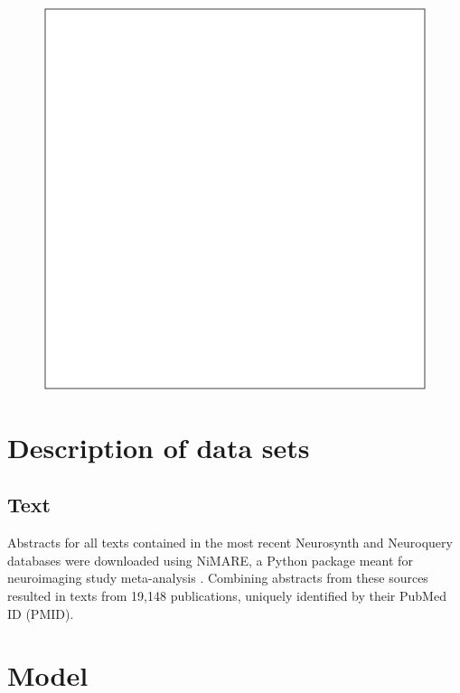 \begin{figure}[tp!]
  \centering	
    \includegraphics[width=\columnwidth]{figures/localized/null.pdf}  
  \caption{
  }
  \label{fig:papertag.}
\end{figure}

\section{Description of data sets}
\label{sec:papertag.data}

\subsection{Text}

Abstracts for all texts contained in the most recent Neurosynth and Neuroquery databases were downloaded using NiMARE, a Python package meant for neuroimaging study meta-analysis \cite{SaloEtAl2022, SaloEtAl2023}. Combining abstracts from these sources resulted in texts from 19,148 publications, uniquely identified by their PubMed ID (PMID). 

\section{Model}
\label{sec:papertag.model}

